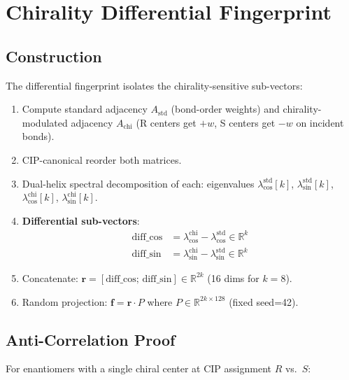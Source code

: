 \documentclass[11pt,a4paper]{article}
\begin{document}
\section{Chirality Differential Fingerprint}
\label{sec:diff-fp}

\subsection{Construction}

The differential fingerprint isolates the chirality-sensitive sub-vectors:

\begin{enumerate}[leftmargin=*]
    \item Compute standard adjacency $A_{\text{std}}$ (bond-order weights) and chirality-modulated adjacency $A_{\text{chi}}$ (R centers get $+w$, S centers get $-w$ on incident bonds).
    \item CIP-canonical reorder both matrices.
    \item Dual-helix spectral decomposition of each: eigenvalues $\lambda^{\text{std}}_{\cos}[k]$, $\lambda^{\text{std}}_{\sin}[k]$, $\lambda^{\text{chi}}_{\cos}[k]$, $\lambda^{\text{chi}}_{\sin}[k]$.
    \item \textbf{Differential sub-vectors}:
    \begin{align}
        \text{diff\_cos} &= \lambda^{\text{chi}}_{\cos} - \lambda^{\text{std}}_{\cos} \in \mathbb{R}^k \\
        \text{diff\_sin} &= \lambda^{\text{chi}}_{\sin} - \lambda^{\text{std}}_{\sin} \in \mathbb{R}^k
    \end{align}
    \item Concatenate: $\mathbf{r} = [\text{diff\_cos};\, \text{diff\_sin}] \in \mathbb{R}^{2k}$ (16 dims for $k=8$).
    \item Random projection: $\mathbf{f} = \mathbf{r} \cdot P$ where $P \in \mathbb{R}^{2k \times 128}$ (fixed seed=42).
\end{enumerate}

\subsection{Anti-Correlation Proof}

For enantiomers with a single chiral center at CIP assignment $R$ vs.\ $S$:
\end{document}
